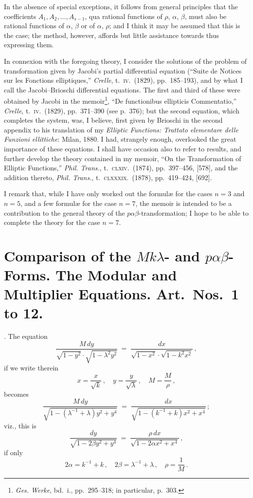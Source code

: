 \documentclass[11pt]{article}
\begin{document}
\medskip

\noindent In the absence of special exceptions, it follows from general principles that the coefficients $A_1, A_2, \ldots, A_{s-1}$, qua rational functions of $\rho$, $\alpha$, $\beta$, must also be rational functions of $\alpha$, $\beta$ or of $\alpha$, $\rho$; and I think it may be assumed that this is the case; the method, however, affords but little assistance towards thus expressing them.

\medskip

\noindent In connexion with the foregoing theory, I consider the solutions of the problem of transformation given by Jacobi's partial differential equation (``Suite de Notices sur les Fonctions elliptiques,'' \textit{Crelle}, t.~\textsc{iv}.\ (1829), pp.~185--193), and by what I call the Jacobi--Brioschi differential equations. The first and third of these were obtained by Jacobi in the memoir\footnote{\textit{Ges. Werke}, bd.~i., pp.~295--318; in particular, p.~303.}, ``De functionibus ellipticis Commentatio,'' \textit{Crelle}, t.~\textsc{iv}.\ (1829), pp.~371--390 (see p.~376); but the second equation, which completes the system, was, I believe, first given by Brioschi in the second appendix to his translation of my \textit{Elliptic Functions: Trattato elementare delle Funzioni ellittiche}: Milan, 1880. I had, strangely enough, overlooked the great importance of these equations. I shall have occasion also to refer to results, and further develop the theory contained in my memoir, ``On the Transformation of Elliptic Functions,'' \textit{Phil. Trans.}, t.~\textsc{clxiv}.\ (1874), pp.~397--456, [578], and the addition thereto, \textit{Phil. Trans.}, t.~\textsc{clxxxix}.\ (1878), pp.~419--424, [692].

\medskip

\noindent I remark that, while I have only worked out the formul\ae{} for the cases $n=3$ and $n=5$, and a few formul\ae{} for the case $n=7$, the memoir is intended to be a contribution to the general theory of the $p\alpha\beta$-transformation; I hope to be able to complete the theory for the case $n=7$.

\newpage

\section*{Comparison of the $Mk\lambda$- and $p\alpha\beta$-Forms. The Modular and Multiplier Equations. Art.\ Nos.\ 1 to 12.}

. The equation
\[
\frac{M\,dy}{\sqrt{1-y^2}\cdot\sqrt{1-\lambda^2 y^2}} \;=\; \frac{dx}{\sqrt{1-x^2}\cdot\sqrt{1-k^2 x^2}}\,,
\]
if we write therein
\[
x = \frac{x}{\sqrt{k}}\,,\quad y = \frac{y}{\sqrt{\lambda}}\,,\quad M = \frac{M}{\rho}\,,
\]
becomes
\[
\frac{M\,dy}{\sqrt{1-(\lambda^{-1}+\lambda)y^2 + y^4}} \;=\; \frac{dx}{\sqrt{1-(k^{-1}+k)x^2 + x^4}}\,;
\]
viz., this is
\[
\frac{dy}{\sqrt{1 - 2\beta y^2 + y^4}} \;=\; \frac{\rho\,dx}{\sqrt{1 - 2\alpha x^2 + x^4}}\,,
\]
if only
\[
2\alpha = k^{-1} + k\,,\quad 2\beta = \lambda^{-1} + \lambda\,,\quad \rho = \frac{1}{M}\,.
\]
\end{document}
